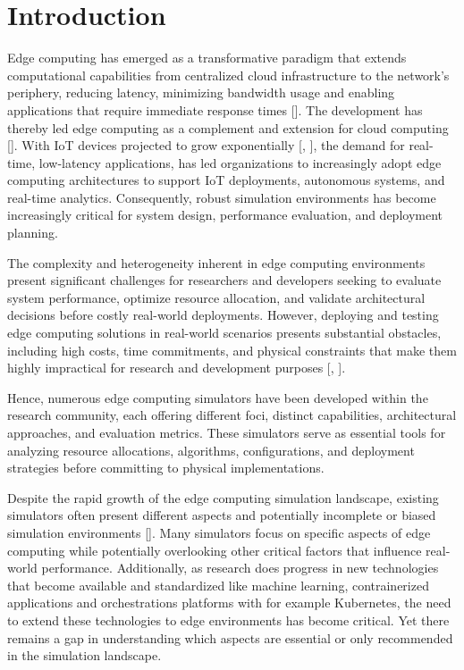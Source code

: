 \chapter{Introduction}
Edge computing has emerged as a transformative paradigm that extends computational capabilities from centralized cloud infrastructure to the network's periphery, 
reducing latency, minimizing bandwidth usage and enabling applications that require immediate response times [\cite{7488250}].
The development has thereby led edge computing as a complement and extension for cloud computing [\cite{ASHOURI2021100346}]. 
With IoT devices projected to grow exponentially [\cite{7488250}, \cite{10258346}], the demand for real-time, low-latency applications, has led organizations to 
increasingly adopt edge computing architectures to support IoT deployments, autonomous systems, and real-time analytics.  
Consequently, robust simulation environments has become increasingly critical for system design, performance evaluation, and deployment planning.

The complexity and heterogeneity inherent in edge computing environments present significant challenges for researchers and developers seeking to evaluate system performance, 
optimize resource allocation, and validate architectural decisions before costly real-world deployments. 
However, deploying and testing edge computing solutions in real-world scenarios presents substantial obstacles, including high costs, time commitments, and physical constraints 
that make them highly impractical for research and development purposes [\cite{ASHOURI2021100346}, \cite{7488250}]. 

Hence, numerous edge computing simulators have been developed within the research community, each offering different foci, distinct capabilities, architectural approaches, and evaluation metrics. 
These simulators serve as essential tools for analyzing resource allocations, algorithms, configurations, and deployment strategies before committing to physical implementations.

Despite the rapid growth of the edge computing simulation landscape, existing simulators often present different aspects and potentially incomplete or biased simulation environments [\cite{ASHOURI2021100346}]. 
Many simulators focus on specific aspects of edge computing while potentially overlooking other critical factors that influence real-world performance.
Additionally, as research does progress in new technologies that become available and standardized like machine learning, contrainerized applications and orchestrations platforms with for example Kubernetes, the need to extend 
these technologies to edge environments has become critical.
Yet there remains a gap in understanding which aspects are essential or only recommended in the simulation landscape.

